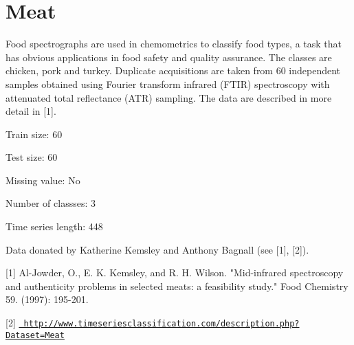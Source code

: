\chapter{Meat}
\hypertarget{md_external_2data_2UCRArchive__2018_2Meat_2README}{}\label{md_external_2data_2UCRArchive__2018_2Meat_2README}
\label{md_external_2data_2UCRArchive__2018_2Meat_2README_autotoc_md137}%
%
 Food spectrographs are used in chemometrics to classify food types, a task that has obvious applications in food safety and quality assurance. The classes are chicken, pork and turkey. Duplicate acquisitions are taken from 60 independent samples obtained using Fourier transform infrared (FTIR) spectroscopy with attenuated total reflectance (ATR) sampling. The data are described in more detail in \mbox{[}1\mbox{]}.

Train size\+: 60

Test size\+: 60

Missing value\+: No

Number of classses\+: 3

Time series length\+: 448

Data donated by Katherine Kemsley and Anthony Bagnall (see \mbox{[}1\mbox{]}, \mbox{[}2\mbox{]}).

\mbox{[}1\mbox{]} Al-\/\+Jowder, O., E. K. Kemsley, and R. H. Wilson. "{}\+Mid-\/infrared spectroscopy and authenticity problems in selected meats\+: a feasibility study."{} Food Chemistry 59. (1997)\+: 195-\/201.

\mbox{[}2\mbox{]} \href{http://www.timeseriesclassification.com/description.php?Dataset=Meat}{\texttt{ http\+://www.\+timeseriesclassification.\+com/description.\+php?\+Dataset=\+Meat}} 